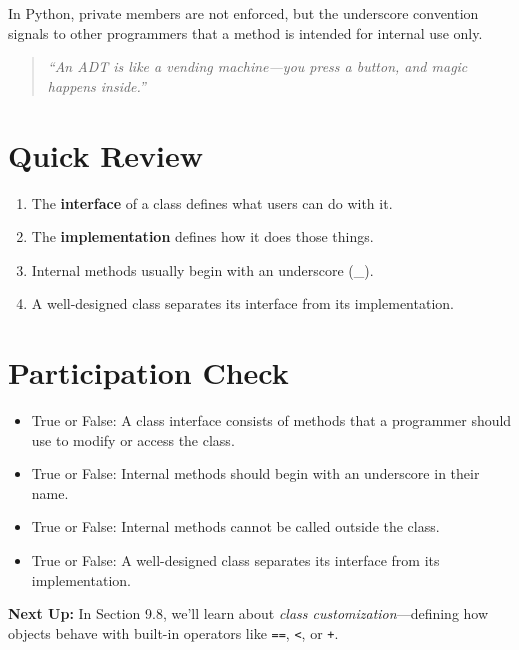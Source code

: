 \vspace{1em}
\noindent
In Python, private members are not enforced, but the underscore convention signals to other programmers that a method is intended for internal use only.

\begin{quote}
\textit{“An ADT is like a vending machine—you press a button, and magic happens inside.”}
\end{quote}

\section{Quick Review}
\begin{enumerate}
    \item The \textbf{interface} of a class defines what users can do with it.
    \item The \textbf{implementation} defines how it does those things.
    \item Internal methods usually begin with an underscore (\_).
    \item A well-designed class separates its interface from its implementation.
\end{enumerate}

\section*{Participation Check}
\begin{itemize}
    \item True or False: A class interface consists of methods that a programmer should use to modify or access the class.
    \item True or False: Internal methods should begin with an underscore in their name.
    \item True or False: Internal methods cannot be called outside the class.
    \item True or False: A well-designed class separates its interface from its implementation.
\end{itemize}

\vspace{2em}
\noindent
\textbf{Next Up:} In Section 9.8, we’ll learn about \textit{class customization}—defining how objects behave with built-in operators like \texttt{==}, \texttt{<}, or \texttt{+}.

